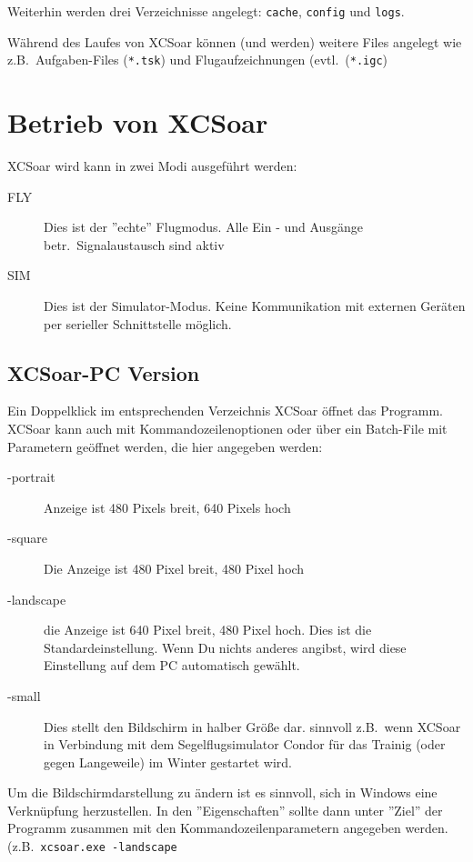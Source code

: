 Weiterhin werden drei Verzeichnisse angelegt: \texttt{cache}, \texttt{config} und \texttt{logs}.  

Während des Laufes von {\textsf  XCSoar} können (und werden) weitere Files angelegt wie z.B.\  Aufgaben-Files (\texttt{*.tsk}) 
und Flugaufzeichnungen (evtl.\ (\texttt{*.igc})


\section{Betrieb von {\textsf  XCSoar}}

{\textsf  XCSoar} wird kann in zwei Modi ausgeführt werden:
\begin{description}
\item[FLY] Dies ist der ''echte'' Flugmodus. Alle Ein - und Ausgänge betr.\ Signalaustausch sind aktiv
\item[SIM] Dies ist der Simulator-Modus. Keine Kommunikation mit externen Geräten per serieller Schnittstelle möglich. 
\end{description}

\subsection*{{\textsf  XCSoar}-PC Version}
Ein Doppelklick im entsprechenden Verzeichnis {\textsf  XCSoar} öffnet das Programm. 
{\textsf  XCSoar} kann auch mit Kommandozeilenoptionen oder über ein Batch-File mit Parametern geöffnet werden, 
die hier angegeben werden: 

\begin{description}
\item[-portrait] Anzeige ist 480 Pixels breit, 640 Pixels hoch
\item[-square] Die Anzeige ist 480 Pixel breit, 480 Pixel hoch
\item[-landscape] die Anzeige ist 640 Pixel breit, 480 Pixel hoch. Dies ist die Standardeinstellung.
Wenn Du nichts anderes angibst, wird diese Einstellung auf dem PC automatisch gewählt.
\item[-small] Dies stellt den Bildschirm in halber Größe dar. sinnvoll z.B.\ wenn {\textsf  XCSoar} in Verbindung mit dem Segelflugsimulator 
{\sc Condor} für das Trainig (oder gegen Langeweile) im Winter gestartet wird.
\end{description}

Um die Bildschirmdarstellung zu ändern ist es sinnvoll, sich in Windows eine Verknüpfung herzustellen. 
In den ''Eigenschaften'' sollte dann unter ''Ziel'' der Programm zusammen mit den Kommandozeilenparametern 
angegeben werden. (z.B.\ \texttt{xcsoar.exe -landscape}


